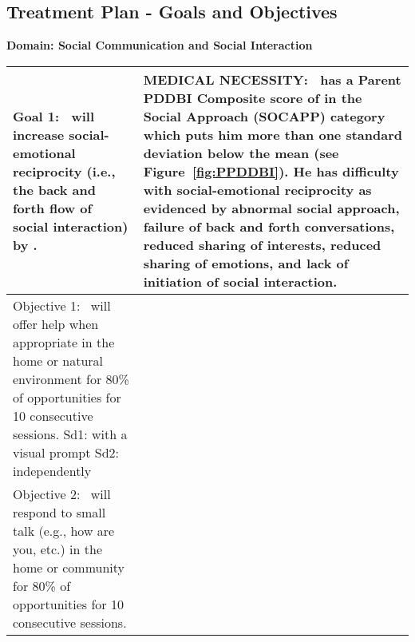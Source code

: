 \documentclass{article}
\def\clientfirstname{}
\def\ending{}
\begin{document}
\begin{landscape}
\section{Treatment Plan - Goals and Objectives}

\textbf{Domain: Social Communication and Social Interaction}\\
	
	\begin{tabular}{|p{11cm}|p{11cm}|}
	\hline
	\textbf{Goal 1:  \clientfirstname\ will increase social-emotional reciprocity (i.e., the back and forth flow of social interaction) by \ending.} & \textbf{MEDICAL NECESSITY:  \clientfirstname\ has a Parent PDDBI Composite score of \getcell{9}{T score} {\parent} in the Social Approach (SOCAPP) category which puts him more than one standard deviation below the mean (see Figure~\ref{fig:PPDDBI}).  He has difficulty with social-emotional reciprocity as evidenced by abnormal social approach, failure of back and forth conversations, reduced sharing of interests, reduced sharing of emotions, and lack of initiation of social interaction.} \\ 
	\hline
	Objective 1: \clientfirstname\ will offer help \underline{\hspace{0.5cm}}when appropriate in the home or natural environment for 80\% of opportunities for 10 consecutive sessions.\newline\newline
	Sd1: with a visual prompt\newline
	Sd2: independently\newline
	& \raisebox{-6.0cm}{\texttt{[image: Help.png]}}\\
	\hline
	
	Objective 2: \clientfirstname\ will respond to small talk (e.g., how are you, etc.) in the home or community for 80\% of opportunities for 10 consecutive sessions. 
	& \\
	\hline
	\end{tabular}\\


\end{landscape}
\end{document}
